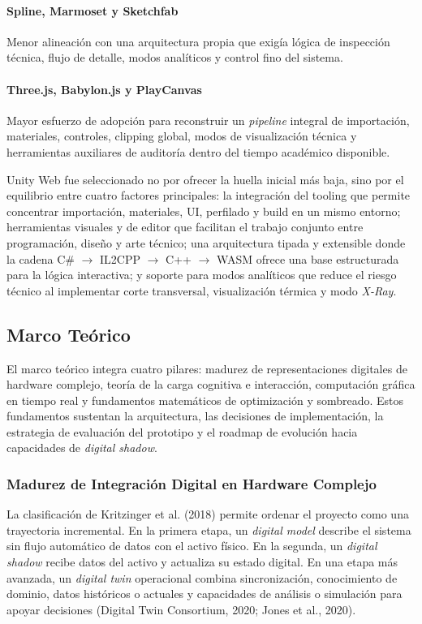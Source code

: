 \paragraph{Spline, Marmoset y Sketchfab} Menor alineación con una arquitectura propia que exigía lógica de inspección técnica, flujo de detalle, modos analíticos y control fino del sistema.

\paragraph{Three.js, Babylon.js y PlayCanvas} Mayor esfuerzo de adopción para reconstruir un \textit{pipeline} integral de importación, materiales, controles, clipping global, modos de visualización técnica y herramientas auxiliares de auditoría dentro del tiempo académico disponible.

Unity Web fue seleccionado no por ofrecer la huella inicial más baja, sino por el equilibrio entre cuatro factores principales: la integración del tooling que permite concentrar importación, materiales, UI, perfilado y build en un mismo entorno; herramientas visuales y de editor que facilitan el trabajo conjunto entre programación, diseño y arte técnico; una arquitectura tipada y extensible donde la cadena C\# $\rightarrow$ IL2CPP $\rightarrow$ C++ $\rightarrow$ WASM ofrece una base estructurada para la lógica interactiva; y soporte para modos analíticos que reduce el riesgo técnico al implementar corte transversal, visualización térmica y modo \textit{X-Ray}.

\FloatBarrier
\subsection{Marco Teórico}

El marco teórico integra cuatro pilares: madurez de representaciones digitales de hardware complejo, teoría de la carga cognitiva e interacción, computación gráfica en tiempo real y fundamentos matemáticos de optimización y sombreado. Estos fundamentos sustentan la arquitectura, las decisiones de implementación, la estrategia de evaluación del prototipo y el roadmap de evolución hacia capacidades de \textit{digital shadow}.

\subsubsection{Madurez de Integración Digital en Hardware Complejo}

La clasificación de Kritzinger et al. (2018) permite ordenar el proyecto como una trayectoria incremental. En la primera etapa, un \textit{digital model} describe el sistema sin flujo automático de datos con el activo físico. En la segunda, un \textit{digital shadow} recibe datos del activo y actualiza su estado digital. En una etapa más avanzada, un \textit{digital twin} operacional combina sincronización, conocimiento de dominio, datos históricos o actuales y capacidades de análisis o simulación para apoyar decisiones (Digital Twin Consortium, 2020; Jones et al., 2020).

